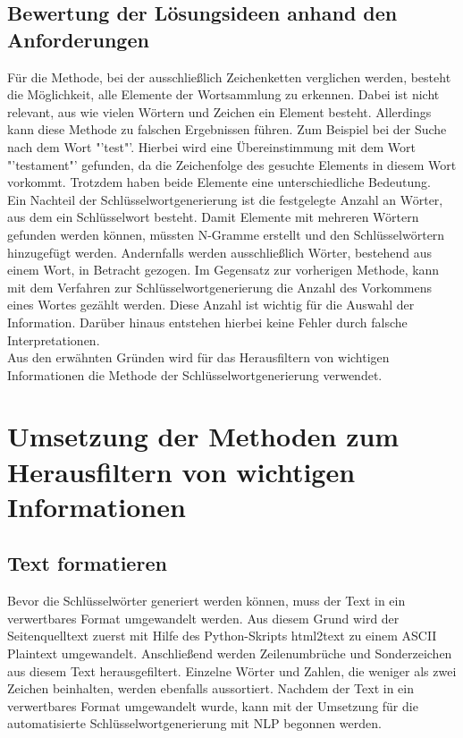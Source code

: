 	\subsection{Bewertung der Lösungsideen anhand den Anforderungen}
	Für die Methode, bei der ausschließlich Zeichenketten verglichen werden, besteht die Möglichkeit, alle Elemente der Wortsammlung zu erkennen. Dabei ist nicht relevant, aus wie vielen Wörtern und Zeichen ein Element besteht. Allerdings kann diese Methode zu falschen Ergebnissen führen. Zum Beispiel bei der Suche nach dem Wort "'test"'. Hierbei wird eine Übereinstimmung mit dem Wort "'testament"' gefunden, da die Zeichenfolge des gesuchte Elements in diesem Wort vorkommt. Trotzdem haben beide Elemente eine unterschiedliche Bedeutung. \\
	Ein Nachteil der Schlüsselwortgenerierung ist die festgelegte Anzahl an Wörter, aus dem ein Schlüsselwort besteht. Damit Elemente mit mehreren Wörtern gefunden werden können, müssten N-Gramme erstellt und den Schlüsselwörtern hinzugefügt werden.  Andernfalls werden ausschließlich Wörter, bestehend aus einem Wort, in Betracht gezogen. Im Gegensatz zur vorherigen Methode, kann mit dem Verfahren zur Schlüsselwortgenerierung die Anzahl des Vorkommens eines Wortes gezählt werden. Diese Anzahl ist wichtig für die Auswahl der Information. Darüber hinaus entstehen hierbei keine Fehler durch falsche Interpretationen.\\
	Aus den erwähnten Gründen wird für das Herausfiltern von wichtigen Informationen die Methode der Schlüsselwortgenerierung verwendet.


\section{Umsetzung der Methoden zum Herausfiltern von wichtigen Informationen}
	\subsection{Text formatieren}
	\label{subsec:TextFormatieren}
	Bevor die Schlüsselwörter generiert werden können, muss der Text in ein verwertbares Format umgewandelt werden. Aus diesem Grund wird der Seitenquelltext zuerst mit Hilfe des Python-Skripts html2text zu einem ASCII Plaintext umgewandelt.\cite{html2text} Anschließend werden Zeilenumbrüche und Sonderzeichen aus diesem Text herausgefiltert. Einzelne Wörter und Zahlen, die weniger als zwei Zeichen beinhalten, werden ebenfalls aussortiert. Nachdem der Text in ein verwertbares Format umgewandelt wurde, kann mit der Umsetzung für die automatisierte Schlüsselwortgenerierung mit NLP begonnen werden.
	
